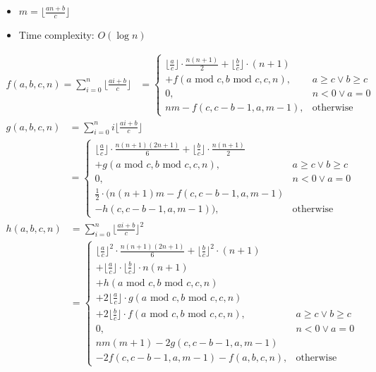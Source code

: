 \begin{itemize}
  \item $m = \lfloor\frac{an + b}{c}\rfloor$
  \item Time complexity: $O(\log{n})$
\end{itemize}

$$ \begin{aligned}
  f(a, b, c, n) = \sum_{i = 0}^{n}\lfloor\frac{ai + b}{c}\rfloor
  &= \begin{cases}
    \lfloor\frac{a}{c}\rfloor \cdot \frac{n(n + 1)}{2} + \lfloor\frac{b}{c}\rfloor \cdot (n + 1) \\ + f(a\text{ mod } c, b\text{ mod } c, c, n), & a \geq c \lor b \geq c \\
    0, & n < 0 \lor a = 0 \\
    nm - f(c, c - b - 1, a, m - 1), & \text{otherwise}
  \end{cases}
\end{aligned} $$
$$ \begin{aligned}
  g(a, b, c, n) &= \sum_{i = 0}^{n}i\lfloor\frac{ai + b}{c}\rfloor \\
  &= \begin{cases}
    \lfloor{\frac{a}{c}}\rfloor \cdot \frac{n(n + 1)(2n + 1)}{6} + \lfloor\frac{b}{c}\rfloor \cdot \frac{n(n + 1)}{2} \\ + g(a\text{ mod } c, b\text{ mod } c, c, n), & a \geq c \lor b \geq c \\
    0, & n < 0 \lor a = 0 \\
    \frac{1}{2} \cdot (n(n + 1)m - f(c, c - b - 1, a, m - 1) \\ - h(c, c - b - 1, a, m - 1)), & \text{otherwise}
  \end{cases}
\end{aligned} $$
$$ \begin{aligned}
  h(a, b, c, n) &= \sum_{i = 0}^{n}\lfloor\frac{ai + b}{c}\rfloor^2 \\
  &= \begin{cases}
    \lfloor\frac{a}{c}\rfloor^2 \cdot \frac{n(n + 1)(2n + 1)}{6} + \lfloor\frac{b}{c}\rfloor^2 \cdot (n + 1) \\ + \lfloor\frac{a}{c}\rfloor \cdot \lfloor\frac{b}{c}\rfloor \cdot n(n + 1) \\ + h(a\text{ mod } c, b\text{ mod } c, c, n) \\ + 2\lfloor\frac{a}{c}\rfloor \cdot g(a\text{ mod } c, b\text{ mod } c, c, n) \\ + 2\lfloor\frac{b}{c}\rfloor \cdot f(a\text{ mod } c, b\text{ mod } c, c, n), & a \geq c \lor b \geq c \\
    0, & n < 0 \lor a = 0 \\
    nm(m + 1) - 2g(c, c - b - 1, a, m - 1) \\ - 2f(c, c - b - 1, a, m - 1) - f(a, b, c, n), & \text{otherwise}
  \end{cases}
\end{aligned} $$

